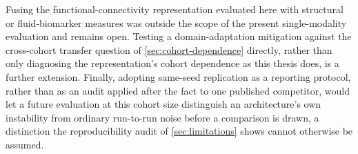 Fusing the functional-connectivity representation evaluated here with structural or
fluid-biomarker measures was outside the scope of the present single-modality evaluation
and remains open. Testing a domain-adaptation mitigation against the cross-cohort transfer
question of \autoref{sec:cohort-dependence} directly, rather than only diagnosing the
representation's cohort dependence as this thesis does, is a further extension. Finally,
adopting same-seed replication as a reporting protocol, rather than as an audit applied
after the fact to one published competitor, would let a future evaluation at this cohort
size distinguish an architecture's own instability from ordinary run-to-run noise before a
comparison is drawn, a distinction the reproducibility audit of \autoref{sec:limitations}
shows cannot otherwise be assumed.
